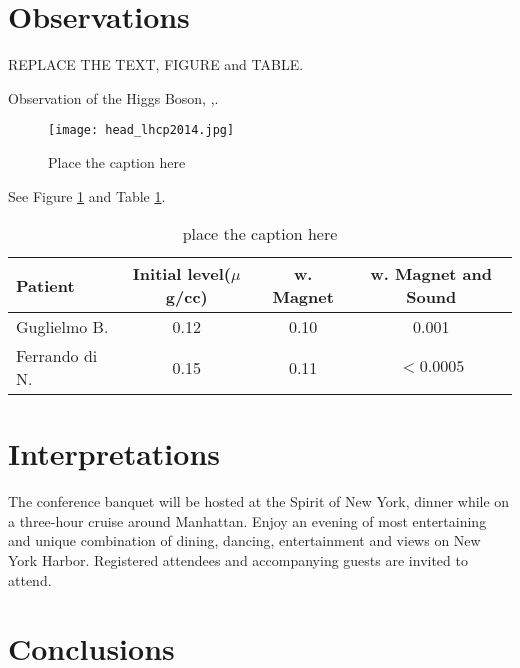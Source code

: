 \documentclass[10pt]{article}
\begin{document}
\section{Observations}

REPLACE THE TEXT, FIGURE and TABLE.

Observation of the Higgs Boson,  \cite{Aad:2012tfa},\cite{Chatrchyan:2012ufa}. 

 
\begin{figure}[htb]
\centering
\texttt{[image: head\_lhcp2014.jpg]}
\caption{ Place the caption here}
\label{fig:figure1}
\end{figure}

See Figure \ref{fig:figure1} and Table \ref{tab:table1}. 

\begin{table}[t]
\begin{center}
\begin{tabular}{l|ccc}  
Patient &  Initial level($\mu$g/cc) &  w. Magnet &  
w. Magnet and Sound \\ \hline
 Guglielmo B.  &   0.12     &     0.10      &     0.001  \\
 Ferrando di N. &  0.15     &     0.11      &  $< 0.0005$ \\ \hline
\end{tabular}
\caption{ place the caption here }
\label{tab:table1}
\end{center}
\end{table}

\section{Interpretations}

The conference banquet will be hosted at the Spirit of New York, dinner while on a three-hour cruise around Manhattan. Enjoy an evening of most entertaining and unique combination of dining, dancing, entertainment and views on New York Harbor. Registered attendees and accompanying guests are invited to attend. 


\section{Conclusions}
\end{document}
